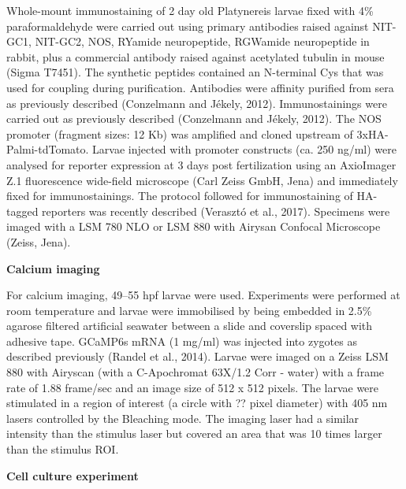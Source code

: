 \documentclass[
  10pt,
  onecolumn]{article}
\begin{document}
Whole-mount immunostaining of 2 day old Platynereis larvae fixed with
4\% paraformaldehyde were carried out using primary antibodies raised
against NIT-GC1, NIT-GC2, NOS, RYamide neuropeptide, RGWamide
neuropeptide in rabbit, plus a commercial antibody raised against
acetylated tubulin in mouse (Sigma T7451). The synthetic peptides
contained an N-terminal Cys that was used for coupling during
purification. Antibodies were affinity purified from sera as previously
described (Conzelmann and Jékely, 2012). Immunostainings were carried
out as previously described (Conzelmann and Jékely, 2012). The NOS
promoter (fragment sizes: 12 Kb) was amplified and cloned upstream of
3xHA- Palmi-tdTomato. Larvae injected with promoter constructs (ca. 250
ng/ml) were analysed for reporter expression at 3 days post
fertilization using an AxioImager Z.1 fluorescence wide-field microscope
(Carl Zeiss GmbH, Jena) and immediately fixed for immunostainings. The
protocol followed for immunostaining of HA-tagged reporters was recently
described (Verasztó et al., 2017). Specimens were imaged with a LSM 780
NLO or LSM 880 with Airysan Confocal Microscope (Zeiss, Jena).

\textbf{Calcium imaging}

For calcium imaging, 49--55 hpf larvae were used. Experiments were
performed at room temperature and larvae were immobilised by being
embedded in 2.5\% agarose filtered artificial seawater between a slide
and coverslip spaced with adhesive tape. GCaMP6s mRNA (1 mg/ml) was
injected into zygotes as described previously (Randel et al., 2014).
Larvae were imaged on a Zeiss LSM 880 with Airyscan (with a C-Apochromat
63X/1.2 Corr - water) with a frame rate of 1.88 frame/sec and an image
size of 512 x 512 pixels. The larvae were stimulated in a region of
interest (a circle with ?? pixel diameter) with 405 nm lasers controlled
by the Bleaching mode. The imaging laser had a similar intensity than
the stimulus laser but covered an area that was 10 times larger than the
stimulus ROI.

\textbf{Cell culture experiment}
\end{document}
